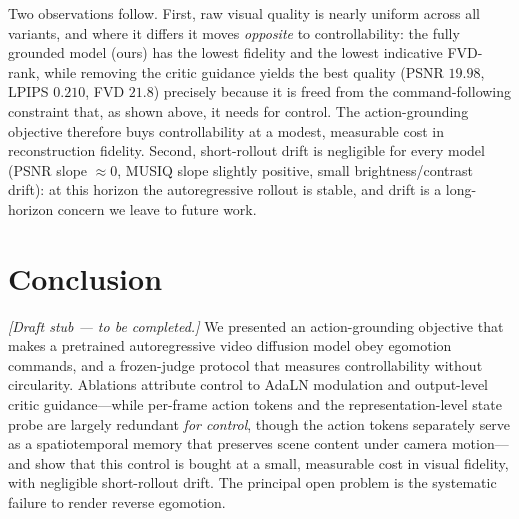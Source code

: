 \documentclass[letterpaper]{article} %
\begin{document}
Two observations follow. First, raw visual quality is nearly uniform across all variants, and where it differs it moves \emph{opposite} to controllability: the fully grounded model (ours) has the lowest fidelity and the lowest indicative FVD-rank, while removing the critic guidance yields the best quality (PSNR $19.98$, LPIPS $0.210$, FVD $21.8$) precisely because it is freed from the command-following constraint that, as shown above, it needs for control. The action-grounding objective therefore buys controllability at a modest, measurable cost in reconstruction fidelity. Second, short-rollout drift is negligible for every model (PSNR slope $\approx 0$, MUSIQ slope slightly positive, small brightness/contrast drift): at this horizon the autoregressive rollout is stable, and drift is a long-horizon concern we leave to future work.

\section{Conclusion}
\emph{[Draft stub --- to be completed.]} We presented an action-grounding objective that makes a pretrained autoregressive video diffusion model obey egomotion commands, and a frozen-judge protocol that measures controllability without circularity. Ablations attribute control to AdaLN modulation and output-level critic guidance---while per-frame action tokens and the representation-level state probe are largely redundant \emph{for control}, though the action tokens separately serve as a spatiotemporal memory that preserves scene content under camera motion---and show that this control is bought at a small, measurable cost in visual fidelity, with negligible short-rollout drift. The principal open problem is the systematic failure to render reverse egomotion.


\end{document}
